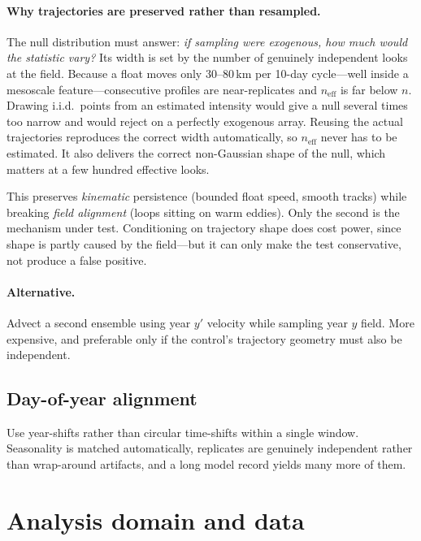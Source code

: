 \documentclass[11pt]{article}
\begin{document}
\paragraph{Why trajectories are preserved rather than resampled.} The null distribution must
answer: \emph{if sampling were exogenous, how much would the statistic vary?} Its width is set
by the number of genuinely independent looks at the field. Because a float moves only
$30$--$80$\,km per 10-day cycle---well inside a mesoscale feature---consecutive profiles are
near-replicates and $n_{\text{eff}}$ is far below $n$. Drawing i.i.d.\ points from an estimated
intensity would give a null several times too narrow and would reject on a perfectly exogenous
array. Reusing the actual trajectories reproduces the correct width automatically, so
$n_{\text{eff}}$ never has to be estimated. It also delivers the correct non-Gaussian shape of
the null, which matters at a few hundred effective looks.

This preserves \emph{kinematic} persistence (bounded float speed, smooth tracks) while breaking
\emph{field alignment} (loops sitting on warm eddies). Only the second is the mechanism under
test. Conditioning on trajectory shape does cost power, since shape is partly caused by the
field---but it can only make the test conservative, not produce a false positive.

\paragraph{Alternative.} Advect a second ensemble using year $y'$ velocity while sampling year
$y$ field. More expensive, and preferable only if the control's trajectory geometry must also
be independent.

\subsection{Day-of-year alignment}

Use year-shifts rather than circular time-shifts within a single window. Seasonality is matched
automatically, replicates are genuinely independent rather than wrap-around artifacts, and a
long model record yields many more of them.

\section{Analysis domain and data}
\label{sec:data}
\end{document}
